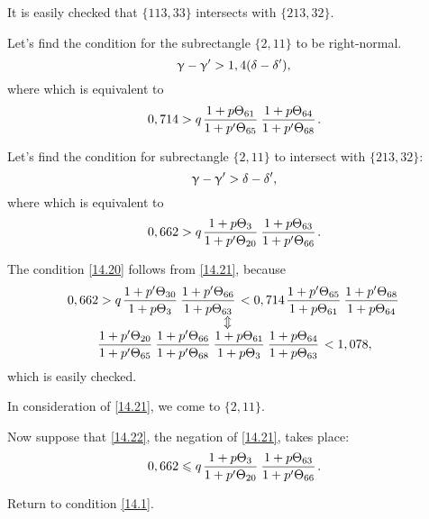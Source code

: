 It is easily checked that $\{113, 33\}$ intersects with $\{213, 32\}$.

Let's find the condition for the subrectangle $\{2, 11\}$ to be right-normal.
\begin{equation*}
	\upgamma - \upgamma' > 1,4 (\delta - \delta'),
\end{equation*}
where
which is equivalent to
\begin{equation}\label{14.20}
	0,714 > q \up{61}{65} \up{64}{68}.
\end{equation}

Let's find the condition for subrectangle $\{2, 11\}$ to intersect with $\{213, 32\}$:
\begin{equation*}
	\upgamma - \upgamma' > \delta - \delta',
\end{equation*}
where
which is equivalent to
\begin{equation}\label{14.21}
	0,662 > q \up{3}{20} \up{63}{66}.
\end{equation}

The condition \ref{14.20} follows from \ref{14.21}, because
\begin{gather*}
	0,662 > q \pu{30}{3} \pu{66}{63} < 0,714 \pu{65}{61} \pu{68}{64}\\
	\ArrowBetweenLines
	\pp{20}{65} \pp{66}{68} \uu{61}{3} \uu{64}{63} < 1,078,
\end{gather*}
which is easily checked.

In consideration of \ref{14.21}, we come to $\{2,11\}$.

Now suppose that \ref{14.22}, the negation of \ref{14.21}, takes place:
\begin{equation}\label{14.22}
	0,662 \leqslant q \up{3}{20} \up{63}{66}.
\end{equation}

Return to condition \ref{14.1}.
